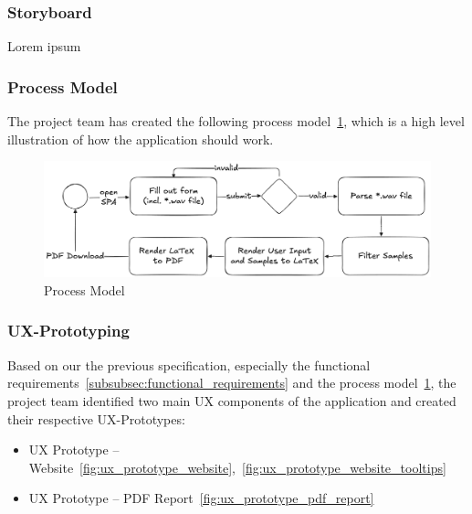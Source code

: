 \subsubsection{Storyboard}\label{subsubsec:storyboard}
Lorem ipsum

\subsubsection{Process Model}\label{subsubsec:process_model}
The project team has created the following process model~\ref{fig:process_model}, which is a high level illustration of how the application should work.

\begin{figure}[H]
    \centering
    \includegraphics[width=1\textwidth]{../assets/process_model.png}
    \caption{Process Model}\label{fig:process_model}
\end{figure}

\subsubsection{UX-Prototyping}\label{subsubsec:ux_prototyping}
Based on our the previous specification, especially the functional requirements~\ref{subsubsec:functional_requirements} and the process model~\ref{fig:process_model}, the project team identified two main UX components of the application and created their respective UX-Prototypes:
\begin{itemize}
    \item UX Prototype – Website~\ref{fig:ux_prototype_website},~\ref{fig:ux_prototype_website_tooltips}
    \item UX Prototype – PDF Report~\ref{fig:ux_prototype_pdf_report}
\end{itemize}

